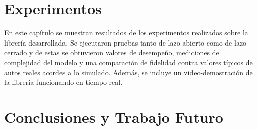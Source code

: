 \documentclass[a4paper,	11pt]{report}
\begin{document}
\chapter{Experimentos}
\label{sec:experiments}
En este capítulo se muestran resultados de los experimentos realizados sobre la librería desarrollada. Se ejecutaron pruebas tanto de lazo abierto como de lazo cerrado y de estas se obtuvieron valores de desempeño, mediciones de complejidad del modelo y una comparación de fidelidad contra valores típicos de autos reales acordes a lo simulado. Además, se incluye un video-demostración de la librería funcionando en tiempo real.


\chapter{Conclusiones y Trabajo Futuro}
\label{sec:conclusions}


\appendix
\label{sec:appendix}



\nocite{*}


\begin{small}

\end{small}
\end{document}
